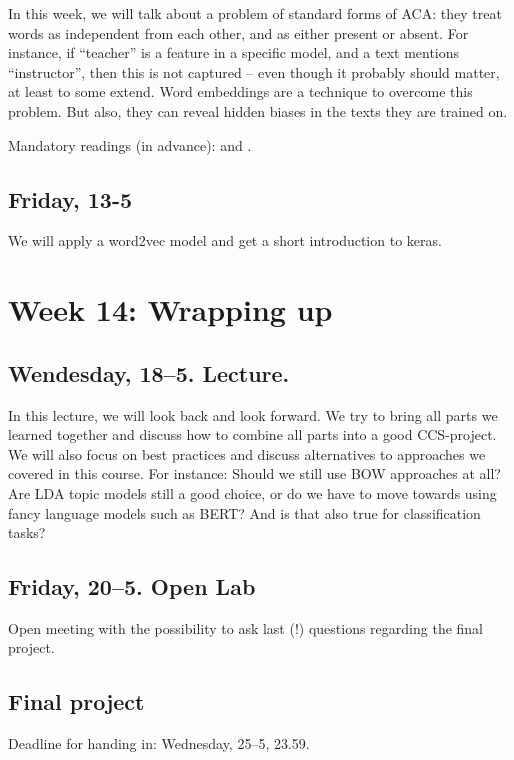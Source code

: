 In this week, we will talk about a problem of standard forms of ACA: they treat words as independent from each other, and as either present or absent. For instance, if ``teacher'' is a feature in a specific model, and a text mentions ``instructor'', then this is not captured -- even though it probably should matter, at least to some extend. Word embeddings are a technique to overcome this problem. But also, they can reveal hidden biases in the texts they are trained on.

Mandatory readings (in advance): \cite{Kusner2015} and \cite{Garg2017}.


\subsection*{Friday, 13-5}
We will apply a word2vec model and get a short introduction to keras.




\section*{Week 14: Wrapping up}

\subsection*{Wendesday, 18--5. Lecture.}
In this lecture, we will look back and look forward. We try to bring all parts we learned together and discuss how to combine all parts into a good CCS-project. We will also focus on best practices and discuss alternatives to approaches we covered in this course. For instance: Should we still use BOW approaches at all? Are LDA topic models still a good choice, or do we have to move towards using fancy language models such as BERT? And is that also true for classification tasks?










\subsection*{Friday, 20--5. Open Lab}
Open meeting with the possibility to ask last (!) questions regarding the final project.


\subsection*{Final project}
Deadline for handing in: Wednesday, 25--5, 23.59.
